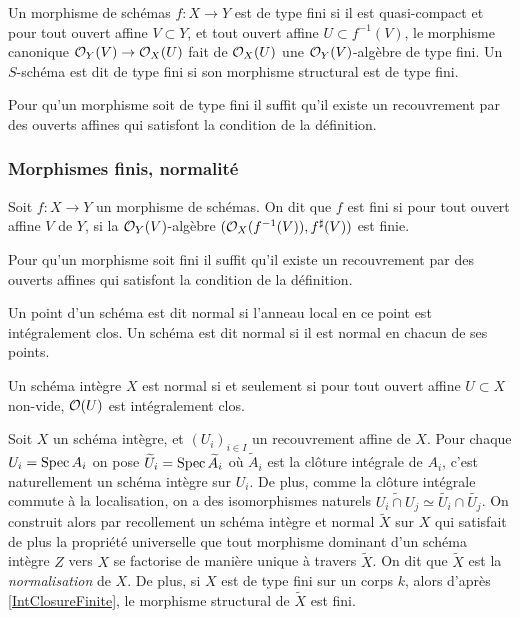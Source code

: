 \begin{defn}
Un morphisme de schémas $f:X\rightarrow Y$ est de type fini si il est quasi-compact et pour tout ouvert affine $V\subset Y$, et tout ouvert affine $U\subset f^{-1}(V)$, le morphisme canonique $\mathcal{O}_Y(V)\rightarrow \mathcal{O}_X(U)$ fait de $\mathcal{O}_X(U)$ une $\mathcal{O}_Y(V)$-algèbre de type fini. Un $S$-schéma est dit de type fini si son morphisme structural est de type fini.
\end{defn}

\begin{rem}
Pour qu'un morphisme soit de type fini il suffit qu'il existe un recouvrement par des ouverts affines qui satisfont la condition de la définition.
\end{rem}

\subsubsection{Morphismes finis, normalité}

\begin{defn}
Soit $f:X \rightarrow Y$ un morphisme de schémas. On dit que $f$ est fini si pour tout ouvert affine $V$ de $Y$, si la $\mathcal{O}_Y(V)$-algèbre $(\mathcal{O}_X(f^{-1}(V)), f^\sharp(V))$ est finie.
\end{defn}

\begin{rem}
Pour qu'un morphisme soit fini il suffit qu'il existe un recouvrement par des ouverts affines qui satisfont la condition de la définition.
\end{rem}


\begin{defn}
Un point d'un schéma est dit normal si l'anneau local en ce point est intégralement clos.
Un schéma est dit normal si il est normal en chacun de ses points.
\end{defn}

\begin{prop}
Un schéma intègre $X$ est normal si et seulement si pour tout ouvert affine $U\subset X$ non-vide, $\mathcal{O}(U)$ est intégralement clos.
\end{prop}

Soit $X$ un schéma intègre, et $(U_i)_{i\in I}$ un recouvrement affine de $X$. Pour chaque $U_i=\operatorname{Spec} A_i$ on pose $\widetilde{U}_i=\operatorname{Spec} \widetilde{A}_i$ où $\widetilde{A}_i$ est la clôture intégrale de $A_i$, c'est naturellement un schéma intègre sur $U_i$. De plus, comme la clôture intégrale  commute à la localisation, on a des isomorphismes naturels $\widetilde{U_i\cap U_j}\simeq \widetilde{U_i}\cap \widetilde{U_j}$. On construit alors par recollement un schéma intègre et normal $\widetilde{X}$ sur $X$ qui satisfait de plus la propriété universelle que tout morphisme dominant d'un schéma intègre $Z$ vers $X$ se factorise de manière unique à travers $\widetilde{X}$. On dit que $\widetilde{X}$ est la \textit{normalisation} de $X$. De plus, si $X$ est de type fini sur un corps $k$, alors d'après \ref{IntClosureFinite}, le morphisme structural de $\widetilde{X}$ est fini.


